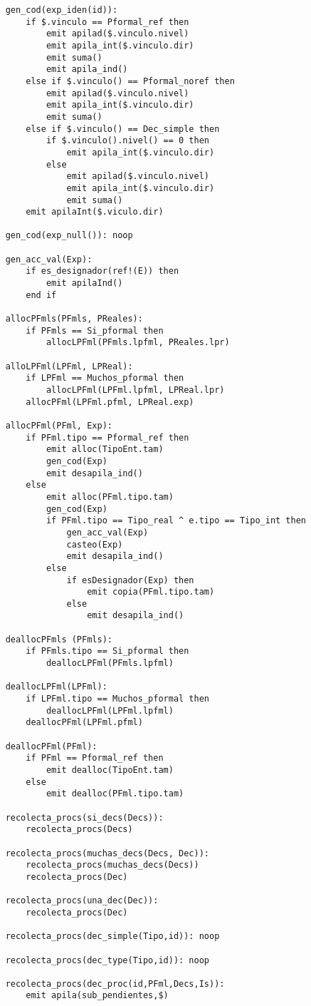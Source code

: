 \begin{lstlisting}
    gen_cod(exp_iden(id)):
        if $.vinculo == Pformal_ref then
            emit apilad($.vinculo.nivel)
            emit apila_int($.vinculo.dir)
            emit suma()
            emit apila_ind()
        else if $.vinculo() == Pformal_noref then
            emit apilad($.vinculo.nivel)
            emit apila_int($.vinculo.dir)
            emit suma()
        else if $.vinculo() == Dec_simple then
            if $.vinculo().nivel() == 0 then
                emit apila_int($.vinculo.dir)
            else 
                emit apilad($.vinculo.nivel)
                emit apila_int($.vinculo.dir)
                emit suma()
        emit apilaInt($.viculo.dir)

    gen_cod(exp_null()): noop

    gen_acc_val(Exp):
        if es_designador(ref!(E)) then
            emit apilaInd()
        end if

    allocPFmls(PFmls, PReales):
        if PFmls == Si_pformal then
            allocLPFml(PFmls.lpfml, PReales.lpr)
    
    alloLPFml(LPFml, LPReal):
        if LPFml == Muchos_pformal then
            allocLPFml(LPFml.lpfml, LPReal.lpr)       
        allocPFml(LPFml.pfml, LPReal.exp)

    allocPFml(PFml, Exp):
        if PFml.tipo == Pformal_ref then
            emit alloc(TipoEnt.tam)
            gen_cod(Exp)
            emit desapila_ind()
        else
            emit alloc(PFml.tipo.tam)
            gen_cod(Exp)
            if PFml.tipo == Tipo_real ^ e.tipo == Tipo_int then
                gen_acc_val(Exp)
                casteo(Exp)
                emit desapila_ind()
            else
                if esDesignador(Exp) then
                    emit copia(PFml.tipo.tam)
                else
                    emit desapila_ind()
        
    deallocPFmls (PFmls):
		if PFmls.tipo == Si_pformal then
			deallocLPFml(PFmls.lpfml)
		
	deallocLPFml(LPFml):
		if LPFml.tipo == Muchos_pformal then
			deallocLPFml(LPFml.lpfml)
		deallocPFml(LPFml.pfml)
	
	deallocPFml(PFml):
		if PFml == Pformal_ref then
			emit dealloc(TipoEnt.tam)
		else
        	emit dealloc(PFml.tipo.tam)

    recolecta_procs(si_decs(Decs)):
        recolecta_procs(Decs)

    recolecta_procs(muchas_decs(Decs, Dec)):
        recolecta_procs(muchas_decs(Decs))
        recolecta_procs(Dec)
    
    recolecta_procs(una_dec(Dec)):
        recolecta_procs(Dec)

    recolecta_procs(dec_simple(Tipo,id)): noop

    recolecta_procs(dec_type(Tipo,id)): noop

    recolecta_procs(dec_proc(id,PFml,Decs,Is)): 
        emit apila(sub_pendientes,$)

\end{lstlisting}
